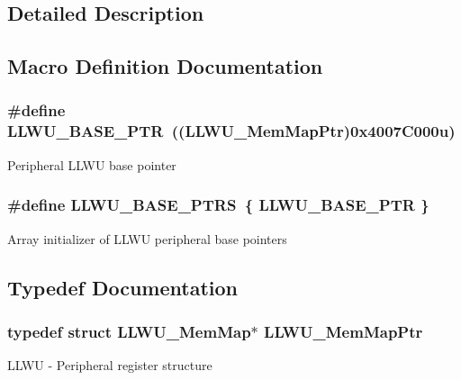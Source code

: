 \subsection{Detailed Description}


\subsection{Macro Definition Documentation}
\hypertarget{group___l_l_w_u___peripheral_ga89c97b9e8756088cb3d8617c022ae6ac}{}
\subsubsection[{L\+L\+W\+U\+\_\+\+B\+A\+S\+E\+\_\+\+P\+T\+R}]{\setlength{\rightskip}{0pt plus 5cm}\#define L\+L\+W\+U\+\_\+\+B\+A\+S\+E\+\_\+\+P\+T\+R~(({\bf L\+L\+W\+U\+\_\+\+Mem\+Map\+Ptr})0x4007\+C000u)}\label{group___l_l_w_u___peripheral_ga89c97b9e8756088cb3d8617c022ae6ac}
Peripheral L\+L\+W\+U base pointer \hypertarget{group___l_l_w_u___peripheral_ga4826d688973513cc02a2f1d4f67c336b}{}
\subsubsection[{L\+L\+W\+U\+\_\+\+B\+A\+S\+E\+\_\+\+P\+T\+R\+S}]{\setlength{\rightskip}{0pt plus 5cm}\#define L\+L\+W\+U\+\_\+\+B\+A\+S\+E\+\_\+\+P\+T\+R\+S~\{ {\bf L\+L\+W\+U\+\_\+\+B\+A\+S\+E\+\_\+\+P\+T\+R} \}}\label{group___l_l_w_u___peripheral_ga4826d688973513cc02a2f1d4f67c336b}
Array initializer of L\+L\+W\+U peripheral base pointers 

\subsection{Typedef Documentation}
\hypertarget{group___l_l_w_u___peripheral_ga03cfefad45ecbfeb2cd16eb85ccfe186}{}
\subsubsection[{L\+L\+W\+U\+\_\+\+Mem\+Map\+Ptr}]{\setlength{\rightskip}{0pt plus 5cm}typedef struct {\bf L\+L\+W\+U\+\_\+\+Mem\+Map}$\ast$ {\bf L\+L\+W\+U\+\_\+\+Mem\+Map\+Ptr}}\label{group___l_l_w_u___peripheral_ga03cfefad45ecbfeb2cd16eb85ccfe186}
L\+L\+W\+U -\/ Peripheral register structure 